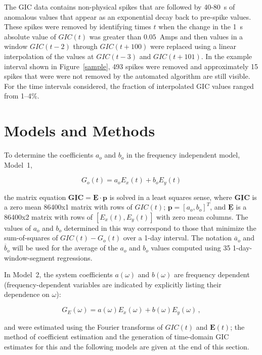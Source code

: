 \documentclass[draft,linenumbers]{agujournal2018}
\begin{document}
The GIC data contains non-physical spikes that are followed by 40-80~s of anomalous values that appear as an exponential decay back to pre-spike values. These spikes were removed by identifying times $t$ when the change in the 1~s absolute value of $GIC(t)$ was greater than $0.05$~Amps and then values in a window $GIC(t-2)$ through $GIC(t+100)$ were replaced using a linear interpolation of the values at $GIC(t-3)$ and $GIC(t + 101)$. In the example interval shown in Figure~\ref{sample}, 493 spikes were removed and approximately 15 spikes that were were not removed by the automated algorithm are still visible. For the time intervals considered, the fraction of interpolated GIC values ranged from 1--4\%.

\section{Models and Methods}
\label{section:Models_and_Methods}

To determine the coefficients $a_o$ and $b_o$ in the frequency independent model, Model~1,

\begin{linenomath*}
  \begin{equation}
    G_o(t) = a_oE_x(t) + b_oE_y(t)
    \label{model1}
  \end{equation}
\end{linenomath*}

\noindent
the matrix equation $\underline{\mathbf{GIC}} = \underline{\mathbf{E}}\cdot\mathbf{p}$ is solved in a least squares sense, where $\underline{\mathbf{GIC}}$ is a zero mean 86400x1 matrix with rows of $GIC(t)$; $\mathbf{p} = [a_o,b_o]^T$, and $\underline{\mathbf{E}}$ is a 86400x2 matrix with rows of $[E_x(t), E_y(t)]$ with zero mean columns. The values of $a_o$ and $b_o$ determined in this way correspond to those that minimize the sum-of-squares of $GIC(t)-G_o(t)$ over a 1-day interval. \citep[][provided the mathematically equivalent analytic equations for solving the matrix equation.]{Pulkkinen2007} The notation $\overline{a}_o$ and $\overline{b}_o$ will be used for the average of the $a_o$ and $b_o$ values computed using 35 1-day-window-segment regressions.

In Model~2, the system coefficients $a(\omega)$ and $b(\omega)$ are frequency dependent (frequency-dependent variables are indicated by explicitly listing their dependence on $\omega$):

\begin{linenomath*}
  \begin{equation}
    G_E(\omega) = a(\omega)E_x(\omega) + b(\omega)E_y(\omega)\,,
    \label{model2}
  \end{equation}
\end{linenomath*}
\noindent
and were estimated using the Fourier transforms of $GIC(t)$ and $\mathbf{E}(t)$; the method of coefficient estimation and the generation of time-domain GIC estimates for this and the following models are given at the end of this section.
\end{document}
